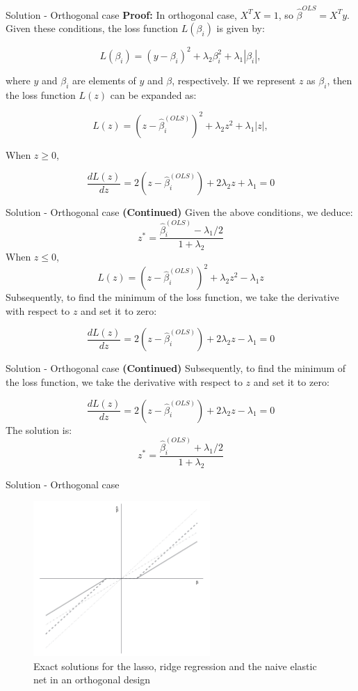 \begin{frame}{Solution - Orthogonal case}
    \textbf{Proof:} In orthogonal case, $X^TX = 1$, so $\hat{\beta}^{OLS}=X^Ty$.
Given these conditions, the loss function \(L(\beta_i)\) is given by:

$$
L(\beta_i) = (y - \beta_i)^2 + \lambda_2 \beta_i^2 + \lambda_1 |\beta_i|,
$$

where \(y\) and \(\beta_i\) are elements of \(y\) and \(\beta\), respectively. If we represent \(z\) as $\beta_i$, then the loss function \(L(z)\) can be expanded as:

$$
L(z) = (z - \hat{\beta}_i^{(OLS)})^2 + \lambda_2 z^2 + \lambda_1 |z|,
$$

When $z \geq 0$,

$$
\frac{dL(z)}{dz} = 2(z - \hat{\beta}_i^{(OLS)}) + 2\lambda_2 z + \lambda_1 = 0
$$

\end{frame}

\begin{frame}{Solution - Orthogonal case}
    \textbf{(Continued)}  Given the above conditions, we deduce: $$ 
z^* = \frac{\hat{\beta}_i^{(OLS)} - \lambda_1 / 2}{1 + \lambda_2}
$$
When $z \leq 0$,
$$
L(z) = (z - \hat{\beta}_i^{(OLS)})^2 + \lambda_2 z^2 - \lambda_1 z
$$
Subsequently, to find the minimum of the loss function, we take the derivative with respect to \( z \) and set it to zero:

$$
\frac{dL(z)}{dz} = 2(z - \hat{\beta}_i^{(OLS)}) + 2 \lambda_2 z - \lambda_1 = 0
$$
\end{frame}

\begin{frame}{Solution - Orthogonal case}
    \textbf{(Continued)} Subsequently, to find the minimum of the loss function, we take the derivative with respect to \( z \) and set it to zero:

$$
\frac{dL(z)}{dz} = 2(z - \hat{\beta}_i^{(OLS)}) + 2 \lambda_2 z - \lambda_1 = 0
$$
The solution is:
$$
z^* = \frac{\hat{\beta}_i^{(OLS)} + \lambda_1 / 2}{1 + \lambda_2}
$$

\end{frame}

\begin{frame}{Solution - Orthogonal case}
    \begin{figure}
        \centering
        \includegraphics[width=0.6\textwidth]{img/image2.png}
        \caption{Exact solutions for the lasso, ridge regression and the naive elastic net in an orthogonal design}
    \end{figure}
\end{frame}

